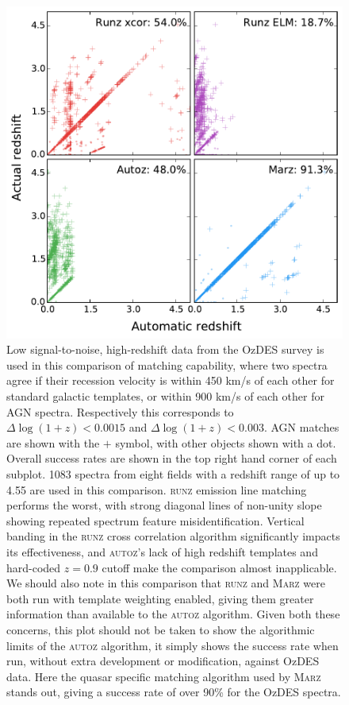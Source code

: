 \documentclass[5p]{elsarticle}
\newcommand{\runz}{\textsc{runz}}
\newcommand{\autoz}{\textsc{autoz}}
\newcommand{\marz}{\textsc{Marz}}
\begin{document}
\begin{figure}[h]
\centering
\includegraphics[width=\columnwidth]{run009Comp.pdf}
\caption{Low signal-to-noise, high-redshift data from the OzDES survey is used in this comparison of matching capability, where two spectra agree if their recession velocity is within 450 km/s of each other for standard galactic templates, or within 900 km/s of each other for AGN spectra. Respectively this corresponds to $\Delta \log(1+z) < 0.0015$ and $\Delta \log(1+z) < 0.003$. AGN matches are shown with the $+$ symbol, with other objects shown with a dot. Overall success rates are shown in the top right hand corner of each subplot. 1083 spectra from eight fields with a redshift range of up to 4.55 are used in this comparison. \runz{} emission line matching performs the worst, with strong diagonal lines of non-unity slope showing repeated spectrum feature misidentification. Vertical banding in the \runz{} cross correlation algorithm significantly impacts its effectiveness, and \autoz{}'s lack of high redshift templates and hard-coded $z=0.9$ cutoff make the comparison almost inapplicable. We should also note in this comparison that \runz{} and \marz{} were both run with template weighting enabled, giving them greater information than available to the \autoz{} algorithm. Given both these concerns, this plot should not be taken to show the algorithmic limits of the \autoz{} algorithm, it simply shows the success rate when run, without extra development or modification, against OzDES data. Here the quasar specific matching algorithm used by \marz{} stands out, giving a success rate of over 90\% for the OzDES spectra.}
\label{fig:low}
\end{figure}
\end{document}
